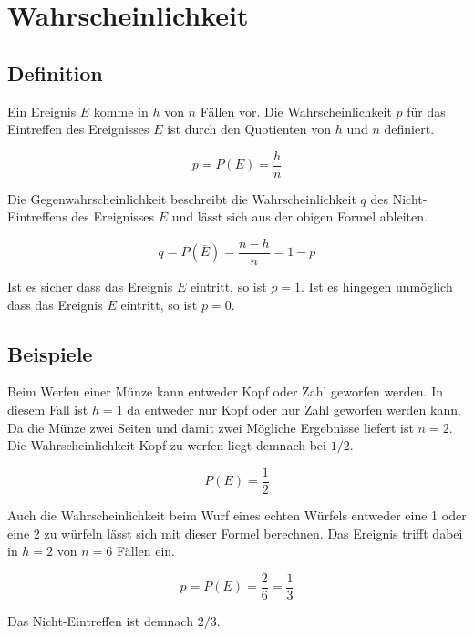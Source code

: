 \section{Wahrscheinlichkeit}

\subsection*{Definition}

Ein Ereignis $E$ komme in $h$ von $n$ Fällen vor. Die Wahrscheinlichkeit $p$ für das Eintreffen des Ereignisses $E$ ist durch den Quotienten von $h$ und $n$ definiert.

\begin{displaymath}
p=P(E)=\frac{h}{n}
\end{displaymath}

Die Gegenwahrscheinlichkeit beschreibt die Wahrscheinlichkeit $q$ des Nicht-Eintreffens des Ereignisses $E$ und lässt sich aus der obigen Formel ableiten.

\begin{displaymath}
q=P(\bar{E})=\frac{n-h}{n}=1-p
\end{displaymath}

Ist es sicher dass das Ereignis $E$ eintritt, so ist $p=1$. Ist es hingegen unmöglich dass das Ereignis $E$ eintritt, so ist $p=0$.

\subsection*{Beispiele}

Beim Werfen einer Münze kann entweder Kopf oder Zahl geworfen werden. In diesem Fall ist $h=1$ da entweder nur Kopf oder nur Zahl geworfen werden kann. Da die Münze zwei Seiten und damit zwei Mögliche Ergebnisse liefert ist $n=2$. Die Wahrscheinlichkeit Kopf zu werfen liegt demnach bei $1/2$.

\begin{displaymath}
P(E)=\frac{1}{2}
\end{displaymath}

Auch die Wahrscheinlichkeit beim Wurf eines echten Würfels entweder eine 1 oder eine 2 zu würfeln lässt sich mit dieser Formel berechnen. Das Ereignis trifft dabei in $h=2$ von $n=6$ Fällen ein. 

\begin{displaymath}
p=P(E)=\frac{2}{6}=\frac{1}{3}
\end{displaymath}

Das Nicht-Eintreffen ist demnach $2/3$.

